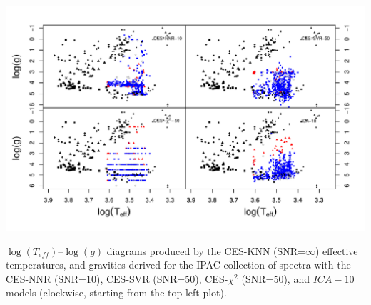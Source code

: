 \begin {figure*}
 \centering
  \includegraphics[width=\textwidth]{figs/ipac-Cesseti.pdf}
  \caption{$\log(T_{eff})$--$\log(g)$ diagrams produced by the CES-KNN
    (SNR=$\infty$) effective temperatures, and gravities derived for
    the IPAC collection of spectra with the CES-NNR (SNR=10), CES-SVR
    (SNR=50), CES-$\chi^2$ (SNR=50), and $ICA-10$ models (clockwise,
    starting from the top left plot).}
 \label{fig:ipac-ces}
\end {figure*}



